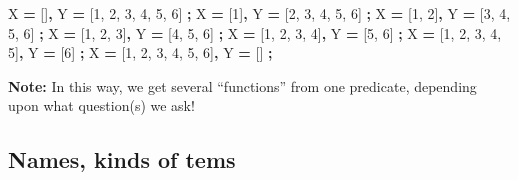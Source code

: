 \documentclass[11pt]{article}
\newenvironment{Shaded}{}{}
\newcommand{\KeywordTok}[1]{\textcolor[rgb]{0.00,0.44,0.13}{\textbf{{#1}}}}
\newcommand{\DataTypeTok}[1]{\textcolor[rgb]{0.56,0.13,0.00}{{#1}}}
\newcommand{\DecValTok}[1]{\textcolor[rgb]{0.25,0.63,0.44}{{#1}}}
\newcommand{\NormalTok}[1]{{#1}}
\begin{document}
\begin{Shaded}
\begin{Highlighting}[]

\DataTypeTok{X} \KeywordTok{=}\NormalTok{ []}\KeywordTok{,}
\DataTypeTok{Y} \KeywordTok{=}\NormalTok{ [}\DecValTok{1}\NormalTok{, }\DecValTok{2}\NormalTok{, }\DecValTok{3}\NormalTok{, }\DecValTok{4}\NormalTok{, }\DecValTok{5}\NormalTok{, }\DecValTok{6}\NormalTok{] }\KeywordTok{;}
\DataTypeTok{X} \KeywordTok{=}\NormalTok{ [}\DecValTok{1}\NormalTok{]}\KeywordTok{,}
\DataTypeTok{Y} \KeywordTok{=}\NormalTok{ [}\DecValTok{2}\NormalTok{, }\DecValTok{3}\NormalTok{, }\DecValTok{4}\NormalTok{, }\DecValTok{5}\NormalTok{, }\DecValTok{6}\NormalTok{] }\KeywordTok{;}
\DataTypeTok{X} \KeywordTok{=}\NormalTok{ [}\DecValTok{1}\NormalTok{, }\DecValTok{2}\NormalTok{]}\KeywordTok{,}
\DataTypeTok{Y} \KeywordTok{=}\NormalTok{ [}\DecValTok{3}\NormalTok{, }\DecValTok{4}\NormalTok{, }\DecValTok{5}\NormalTok{, }\DecValTok{6}\NormalTok{] }\KeywordTok{;}
\DataTypeTok{X} \KeywordTok{=}\NormalTok{ [}\DecValTok{1}\NormalTok{, }\DecValTok{2}\NormalTok{, }\DecValTok{3}\NormalTok{]}\KeywordTok{,}
\DataTypeTok{Y} \KeywordTok{=}\NormalTok{ [}\DecValTok{4}\NormalTok{, }\DecValTok{5}\NormalTok{, }\DecValTok{6}\NormalTok{] }\KeywordTok{;}
\DataTypeTok{X} \KeywordTok{=}\NormalTok{ [}\DecValTok{1}\NormalTok{, }\DecValTok{2}\NormalTok{, }\DecValTok{3}\NormalTok{, }\DecValTok{4}\NormalTok{]}\KeywordTok{,}
\DataTypeTok{Y} \KeywordTok{=}\NormalTok{ [}\DecValTok{5}\NormalTok{, }\DecValTok{6}\NormalTok{] }\KeywordTok{;}
\DataTypeTok{X} \KeywordTok{=}\NormalTok{ [}\DecValTok{1}\NormalTok{, }\DecValTok{2}\NormalTok{, }\DecValTok{3}\NormalTok{, }\DecValTok{4}\NormalTok{, }\DecValTok{5}\NormalTok{]}\KeywordTok{,}
\DataTypeTok{Y} \KeywordTok{=}\NormalTok{ [}\DecValTok{6}\NormalTok{] }\KeywordTok{;}
\DataTypeTok{X} \KeywordTok{=}\NormalTok{ [}\DecValTok{1}\NormalTok{, }\DecValTok{2}\NormalTok{, }\DecValTok{3}\NormalTok{, }\DecValTok{4}\NormalTok{, }\DecValTok{5}\NormalTok{, }\DecValTok{6}\NormalTok{]}\KeywordTok{,}
\DataTypeTok{Y} \KeywordTok{=}\NormalTok{ [] }\KeywordTok{;}
\end{Highlighting}
\end{Shaded}

    \textbf{Note:} In this way, we get several ``functions'' from one
predicate, depending upon what question(s) we ask!

    \hypertarget{names-kinds-of-tems}{%
\subsection{Names, kinds of tems}\label{names-kinds-of-tems}}
\end{document}
